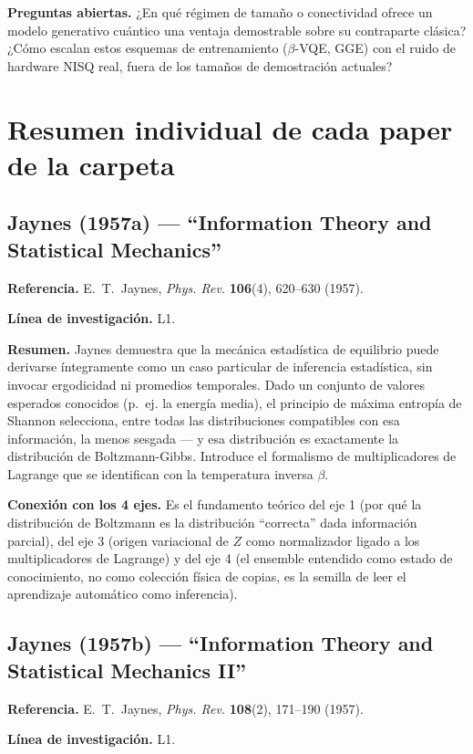 \documentclass[12pt]{article}
\begin{document}
\textbf{Preguntas abiertas.} ¿En qué régimen de tamaño o conectividad ofrece un modelo generativo cuántico una ventaja demostrable sobre su contraparte clásica? ¿Cómo escalan estos esquemas de entrenamiento ($\beta$-VQE, GGE) con el ruido de hardware NISQ real, fuera de los tamaños de demostración actuales?

\section{Resumen individual de cada paper de la carpeta}

\subsection{Jaynes (1957a) --- ``Information Theory and Statistical Mechanics''}
\textbf{Referencia.} E.~T.~Jaynes, \textit{Phys. Rev.} \textbf{106}(4), 620--630 (1957). \cite{jaynesI}

\textbf{Línea de investigación.} L1.

\textbf{Resumen.} Jaynes demuestra que la mecánica estadística de equilibrio puede derivarse íntegramente como un caso particular de inferencia estadística, sin invocar ergodicidad ni promedios temporales. Dado un conjunto de valores esperados conocidos (p.~ej. la energía media), el principio de máxima entropía de Shannon selecciona, entre todas las distribuciones compatibles con esa información, la menos sesgada --- y esa distribución es exactamente la distribución de Boltzmann-Gibbs. Introduce el formalismo de multiplicadores de Lagrange que se identifican con la temperatura inversa $\beta$.

\textbf{Conexión con los 4 ejes.} Es el fundamento teórico del eje 1 (por qué la distribución de Boltzmann es la distribución ``correcta'' dada información parcial), del eje 3 (origen variacional de $Z$ como normalizador ligado a los multiplicadores de Lagrange) y del eje 4 (el ensemble entendido como estado de conocimiento, no como colección física de copias, es la semilla de leer el aprendizaje automático como inferencia).

\subsection{Jaynes (1957b) --- ``Information Theory and Statistical Mechanics II''}
\textbf{Referencia.} E.~T.~Jaynes, \textit{Phys. Rev.} \textbf{108}(2), 171--190 (1957). \cite{jaynesII}

\textbf{Línea de investigación.} L1.
\end{document}

